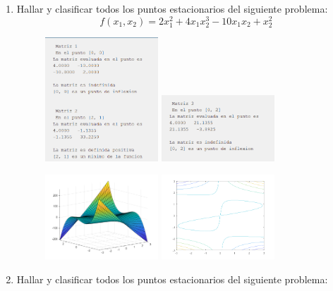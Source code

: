\documentclass[12pt]{article}
\begin{document}
\begin{enumerate}
    \item Hallar y clasificar todos los puntos estacionarios del siguiente problema:
    \[f(x_1,x_2) = 2x_1^2+4x_1x_2^3-10x_1x_2+x_2^2\]
    \begin{figure}[H]
        \centering
        \includegraphics[width = 0.4\textwidth]{1-1.png}
        \includegraphics[width = 0.4\textwidth]{1-2.png}
    \end{figure}
    \begin{figure}[H]
        \centering
        \includegraphics[width = 0.4\textwidth]{1-3.png}
        \includegraphics[width = 0.4\textwidth]{1-4.png}
    \end{figure}
    \newpage
    \item Hallar y clasificar todos los puntos estacionarios del siguiente problema:

\end{enumerate}
\end{document}
